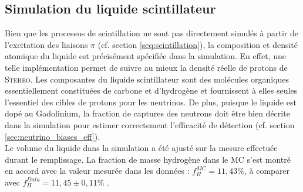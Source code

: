 \subsection{Simulation du liquide scintillateur}

\bigbreak

Bien que les processus de scintillation ne sont pas directement simulés à partir de l'excitation des liaisons $\pi$ (cf. section \ref{seq:scintillation}), la composition et densité atomique du liquide est précisément spécifiée dans la simulation. En effet, une telle implémentation permet de suivre au mieux la densité réelle de protons de \textsc{Stereo}. Les composantes du liquide scintillateur sont des molécules organiques essentiellement constituées de carbone et d'hydrogène et fournissent à elles seules l'essentiel des cibles de protons pour les neutrinos. De plus, puisque le liquide est dopé au Gadolinium, la fraction de captures des neutrons doit être bien décrite dans la simulation pour estimer correctement l'efficacité de détection (cf. section \ref{sec:neutrino_biases_eff}).\\

Le volume du liquide dans la simulation a été ajusté sur la mesure effectuée durant le remplissage. La fraction de masse hydrogène dans le MC s'est montré en accord avec la valeur mesurée dans les données : $f_H^{MC} = 11,43 \%$, à comparer avec $f_H^{Data} = 11,45 \pm 0,11 \%$ \cite{docdb929}.\\



